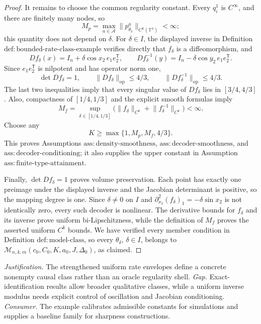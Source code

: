 \documentclass{article}
\begin{document}
\begin{proof}
It remains to choose the common regularity constant.  Every \(q_i^1\) is \(C^\infty\), and there are finitely many nodes, so
\[
 M_p=\max_{a\in\mathcal A}\lVert p_{\theta_\delta}^a\rVert_{C^k(\mathbb T^n)}<\infty;
\]
this quantity does not depend on \(\delta\).  For \(\delta\in I\), the displayed inverse in Definition \(\mathrm{def:bounded\text{-}rate\text{-}class\text{-}example}\) verifies directly that \(f_\delta\) is a diffeomorphism, and
\[
 Df_\delta(x)=I_n+\delta\cos x_2\,e_1e_2^{\mathsf T},
 \qquad
 Df_\delta^{-1}(y)=I_n-\delta\cos y_2\,e_1e_2^{\mathsf T}.
\]
Since \(e_1e_2^{\mathsf T}\) is nilpotent and has operator norm one,
\[
 \det Df_\delta=1,
 \qquad
 \lVert Df_\delta\rVert_{\mathrm{op}}\leq4/3,
 \qquad
 \lVert Df_\delta^{-1}\rVert_{\mathrm{op}}\leq4/3.
\]
The last two inequalities imply that every singular value of \(Df_\delta\) lies in \([3/4,4/3]\).  Also, compactness of \([1/4,1/3]\) and the explicit smooth formulas imply
\[
 M_f=\sup_{\delta\in[1/4,1/3]}
 \bigl(\lVert f_\delta\rVert_{C^k}+\lVert f_\delta^{-1}\rVert_{C^k}\bigr)<\infty.
\]
Choose any
\[
 K\geq\max\{1,M_p,M_f,4/3\}.
\]
This proves Assumptions \(\mathrm{ass:density\text{-}smoothness}\), \(\mathrm{ass:decoder\text{-}smoothness}\), and \(\mathrm{ass:decoder\text{-}conditioning}\); it also supplies the upper constant in Assumption \(\mathrm{ass:finite\text{-}type\text{-}attainment}\).

Finally, \(\det Df_\delta=1\) proves volume preservation.  Each point has exactly one preimage under the displayed inverse and the Jacobian determinant is positive, so the mapping degree is one.  Since \(\delta\neq0\) on \(I\) and \(\partial_{x_2}^2(f_\delta)_1=-\delta\sin x_2\) is not identically zero, every such decoder is nonlinear.  The derivative bounds for \(f_\delta\) and its inverse prove uniform bi-Lipschitzness, while the definition of \(M_f\) proves the asserted uniform \(C^k\) bounds.  We have verified every member condition in Definition \(\mathrm{def:model\text{-}class}\), so every \(\theta_\delta\), \(\delta\in I\), belongs to \(\mathcal M_{n,k,m}(c_0,C_0,K,a_0,J,\Delta_0)\), as claimed.
\end{proof}
\par\smallskip\noindent \textit{Justification.} The strengthened uniform rate envelopes define a concrete nonempty causal class rather than an oracle regularity shell. \textit{Gap.} Exact-identification results allow broader qualitative classes, while a uniform inverse modulus needs explicit control of oscillation and Jacobian conditioning. \textit{Consumer.} The example calibrates admissible constants for simulations and supplies a baseline family for sharpness constructions.
\end{document}
